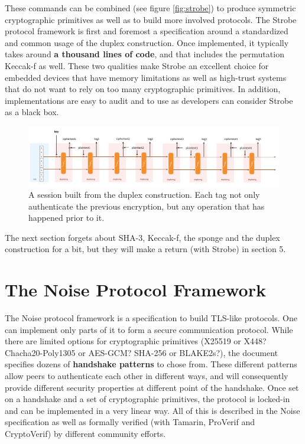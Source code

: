 \documentclass{article}
\begin{document}
These commands can be combined (see figure \ref{fig:strobe}) to produce symmetric cryptographic primitives as well as to build more involved protocols. The Strobe protocol framework is first and foremost a specification around a standardized and common usage of the duplex construction. Once implemented, it typically takes around \textbf{a thousand lines of code}, and that includes the permutation Keccak-f as well. These two qualities make Strobe an excellent choice for embedded devices that have memory limitations as well as high-trust systems that do not want to rely on too many cryptographic primitives. In addition, implementations are easy to audit and to use as developers can consider Strobe as a black box.

\begin{figure}[H]
\centering
\includegraphics[width=\textwidth]{rwcimg/session.png}
\caption{A session built from the duplex construction. Each tag not only authenticate the previous encryption, but any operation that has happened prior to it.}
\end{figure}

The next section forgets about SHA-3, Keccak-f, the sponge and the duplex construction for a bit, but they will make a return (with Strobe) in section 5.

\section{The Noise Protocol Framework}

The Noise protocol framework is a specification\cite{noise} to build TLS-like protocols. One can implement only parts of it to form a secure communication protocol. While there are limited options for cryptographic primitives (X25519 or X448? Chacha20-Poly1305 or AES-GCM? SHA-256 or BLAKE2s?), the document specifies dozens of \textbf{handshake patterns} to chose from. These different patterns allow peers to authenticate each other in different ways, and will consequently provide different security properties at different point of the handshake. Once set on a handshake and a set of cryptographic primitives, the protocol is locked-in and can be implemented in a very linear way. All of this is described in the Noise specification as well as formally verified (with Tamarin\cite{tamarin,suter}, ProVerif\cite{noiseexplorer} and CryptoVerif\cite{cryptoverif}) by different community efforts.\\
\end{document}
